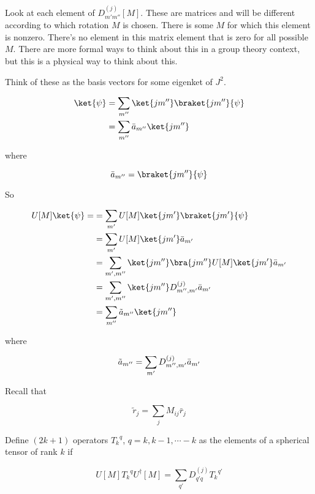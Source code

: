 Look at each element of $D^{(j)}_{m' m''}[M]$.  These are matrices and will be different according to which rotation $M$ is chosen.  There is some $M$ for which this element is nonzero.  There's no element in this matrix element that is zero for all possible $M$.  There are more formal ways to think about this in a group theory context, but this is a physical way to think about this.

Think of these as the basis vectors for some eigenket of $J^2$.

\begin{align*}
\ket{\psi} 
&= \sum_{m''} \ket{j m''} \braket{j m''}{\psi} \\
&= \sum_{m''} \bar{a}_{m''} \ket{j m''}
\end{align*}

where

\begin{equation}\label{eqn:qmTwoL19:n}
\bar{a}_{m''} = \braket{j m''}{\psi} 
\end{equation}

So

\begin{align*}
U[M] \ket{\psi} = 
&= \sum_{m'} U[M] \ket{j m'} \braket{j m'}{\psi} \\
&= \sum_{m'} U[M] \ket{j m'} \bar{a}_{m'} \\
&= \sum_{m', m''} 
\ket{j m''} \bra{j m''}
U[M] \ket{j m'} \bar{a}_{m'} \\
&= \sum_{m', m''} 
\ket{j m''} 
D^{(j)}_{m'', m'}
\bar{a}_{m'} \\
&= \sum_{m''} 
\tilde{a}_{m''} 
\ket{j m''} 
\end{align*}

where 

\begin{equation}\label{eqn:qmTwoL19:n}
\tilde{a}_{m''} = \sum_{m'} D^{(j)}_{m'', m'} \bar{a}_{m'} \\
\end{equation}

Recall that 

\begin{equation}\label{eqn:qmTwoL19:n}
\tilde{r}_j = \sum_j M_{ij} \bar{r}_j
\end{equation}

Define $(2k + 1)$ operators ${T_k}^q$, $q = k, k-1, \cdots -k$ as the elements of a spherical tensor of rank $k$ if 

\begin{equation}\label{eqn:qmTwoL19:n}
U[M] {T_k}^q U^\dagger[M] = \sum_{q'} D^{(j)}_{q' q} {T_k}^{q'}
\end{equation}

